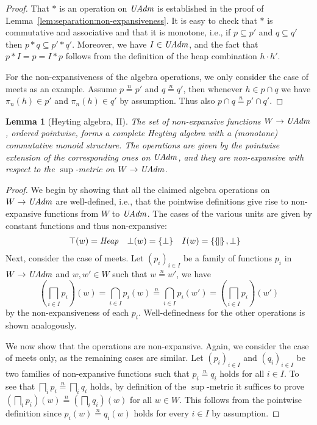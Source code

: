 \documentclass{LMCS}
\newtheorem{lemma}[theorem]{Lemma}
\theoremstyle{remark}
\newcommand{\record}[1]{\ensuremath{\left.\!\{\!|{#1}|\!\}\right.\!}}
\newcommand{\COMB}{\ensuremath{\cdot}}
\newcommand{\nequiv}[1]{\ensuremath{\mathrel{\stackrel{#1}{=}}}}
\begin{document}
\begin{proof}
That $*$ is an operation on $\mathit{UAdm}$ is established in the proof of Lemma~\ref{lem:separation:non-expansiveness}. It is easy to check that $*$ is  commutative and associative and  that it is monotone, i.e., if $p\subseteq p'$ and $q\subseteq q'$ then $p*q\subseteq p'*q'$. Moreover, we have $I\in\mathit{UAdm}$, and the fact that $p * I=p = I * p$ follows from the definition of the heap combination $h\COMB h'$. 


For the non-expansiveness of the algebra operations, we  only consider the case of meets  as an example. Assume $p\nequiv{n}p'$ and $q\nequiv{n}q'$, then whenever $h\in p\cap q$ we have $\pi_n(h)\in p'$ and $\pi_n(h)\in q'$ by assumption. Thus also $p\cap q\nequiv{n} p'\cap q'$.
\end{proof}


\begin{lemma}[Heyting   algebra, II]
\label{lem:UAdm-Heyting-II}
The set of non-expansive functions $W\to\mathit{UAdm}$,  ordered pointwise, forms a complete Heyting algebra with a (monotone) commutative monoid structure. 
The operations are given by the pointwise extension of the corresponding ones on $\mathit{UAdm}$, and  they are non-expansive with respect to the $\sup$-metric on $W\to\mathit{UAdm}$.
\end{lemma}
\begin{proof}
We begin by showing that all the claimed algebra operations on $W\to\mathit{UAdm}$ are well-defined, i.e., that the pointwise definitions give rise to non-expansive functions from $W$ to $\mathit{UAdm}$. 
The cases of the various units are given by constant functions and thus non-expansive:
\begin{align*}
\top(w)&=\Heap 
&
\bot(w)&=\{\bot\}
&
I(w) &=\{\record{},\bot\}
\end{align*}
Next, consider the case of meets. Let $(p_i)_{i\in I}$ be a family of functions $p_i$ in $W\to\mathit{UAdm}$ and $w,w'\in W$ such that $w\nequiv n w'$, we have
\[
(\bigsqcap_{i\in I}p_i)(w) = \bigcap_{i\in I} p_i(w)
\nequiv n \bigcap_{i\in I} p_i(w') = (\bigsqcap_{i\in I} p_i)(w')
\]
by the non-expansiveness of each $p_i$. Well-definedness for the other operations is shown analogously. 

We now show that the operations are non-expansive. Again, we consider the case of meets only, as the remaining cases are similar. 
Let $(p_i)_{i\in I}$ and $(q_i)_{i\in I}$ be two families of non-expansive functions such that $p_i\nequiv n q_i$ holds for all $i\in I$. 
To see that $\bigsqcap_i p_i\nequiv n \bigsqcap_i q_i$ holds,  by definition of the $\sup$-metric it suffices to prove 
$(\bigsqcap_i p_i)(w)\nequiv n (\bigsqcap_i q_i)(w)$ for all $w\in W$. 
This follows from the pointwise definition since $p_i(w)\nequiv n q_i(w)$ holds for every $i\in I$ by assumption.
\end{proof}
\end{document}
